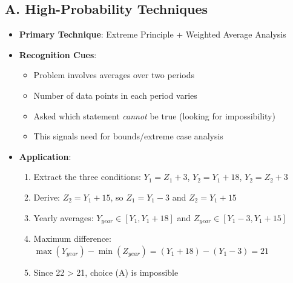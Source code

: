 \documentclass[12pt]{article}
\begin{document}
\begin{techniquesbox}
\subsection*{A. High-Probability Techniques}
\begin{itemize}[leftmargin=*]
    \item \textbf{Primary Technique}: Extreme Principle + Weighted Average Analysis
    \item \textbf{Recognition Cues}: 
    \begin{itemize}
        \item Problem involves averages over two periods
        \item Number of data points in each period varies
        \item Asked which statement \textit{cannot} be true (looking for impossibility)
        \item This signals need for bounds/extreme case analysis
    \end{itemize}
    \item \textbf{Application}: 
    \begin{enumerate}
        \item Extract the three conditions: $Y_1 = Z_1 + 3$, $Y_2 = Y_1 + 18$, $Y_2 = Z_2 + 3$
        \item Derive: $Z_2 = Y_1 + 15$, so $Z_1 = Y_1 - 3$ and $Z_2 = Y_1 + 15$
        \item Yearly averages: $Y_{year} \in [Y_1, Y_1 + 18]$ and $Z_{year} \in [Y_1 - 3, Y_1 + 15]$
        \item Maximum difference: $\max(Y_{year}) - \min(Z_{year}) = (Y_1 + 18) - (Y_1 - 3) = 21$
        \item Since 22 > 21, choice (A) is impossible
    \end{enumerate}
\end{itemize}


\end{techniquesbox}
\end{document}
